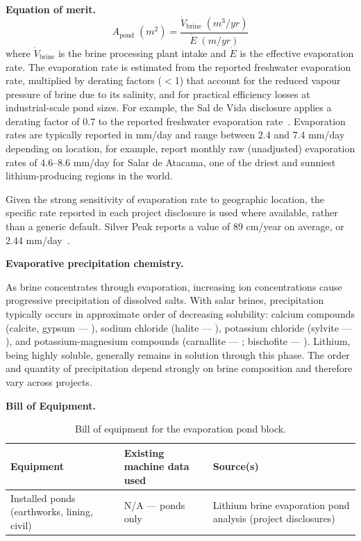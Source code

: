 \documentclass{article}
\renewcommand\_{\textunderscore\allowbreak}
\begin{document}
\medskip
\noindent\textbf{Equation of merit.}\quad
\[
  A_\text{pond}\;(\si{m^2}) = \frac{\dot{V}_\text{brine}\;(\si{m^3/yr})}{\dot{E}\;(\si{m/yr})}
\]
where $\dot{V}_\text{brine}$ is the brine processing plant intake and $\dot{E}$ is the effective evaporation rate. The evaporation rate is estimated from the reported freshwater evaporation rate, multiplied by derating factors ($<$1) that account for the reduced vapour pressure of brine due to its salinity, and for practical efficiency losses at industrial-scale pond sizes. For example, the Sal de Vida disclosure applies a derating factor of 0.7 to the reported freshwater evaporation rate~\cite{montgomeryassociatesconsultoreslimitadaSECTechnicalReport2023}. Evaporation rates are typically reported in mm/day and range between 2.4 and 7.4 mm/day depending on location, for example, \citet{heEnvironmentalLifeCycle2025} report monthly raw (unadjusted) evaporation rates of 4.6--8.6 mm/day for Salar de Atacama, one of the driest and sunniest lithium-producing regions in the world.

Given the strong sensitivity of evaporation rate to geographic location, the specific rate reported in each project disclosure is used where available, rather than a generic default. Silver Peak reports a value of 89 cm/year on average, or 2.44 mm/day~\cite{srkconsultingSECTechnicalReport2023a}. 

\medskip
\noindent\textbf{Evaporative precipitation chemistry.}\quad

As brine concentrates through evaporation, increasing ion concentrations cause progressive precipitation of dissolved salts. With salar brines, precipitation typically occurs in approximate order of decreasing solubility: calcium compounds (calcite, gypsum --- ), sodium chloride (halite --- ), potassium chloride (sylvite --- ), and potassium-magnesium compounds (carnallite --- ; bischofite --- ). Lithium, being highly soluble, generally remains in solution through this phase. The order and quantity of precipitation depend strongly on brine composition and therefore vary across projects.

\medskip
\noindent\textbf{Bill of Equipment.}\quad
 
\begin{table}[h!]
\caption{Bill of equipment for the evaporation pond block.}
\centering
\begin{tabular}{>{\raggedright\arraybackslash}p{5.2cm}
                >{\raggedright\arraybackslash}p{4cm}
                >{\raggedright\arraybackslash}p{4.5cm}}
\toprule
\textbf{Equipment} & \textbf{Existing machine data used} & \textbf{Source(s)} \\
\midrule
Installed ponds (earthworks, lining, civil) & N/A --- ponds only & Lithium brine evaporation pond analysis (project disclosures) \\
\bottomrule
\end{tabular}
\end{table}
 
\end{document}
